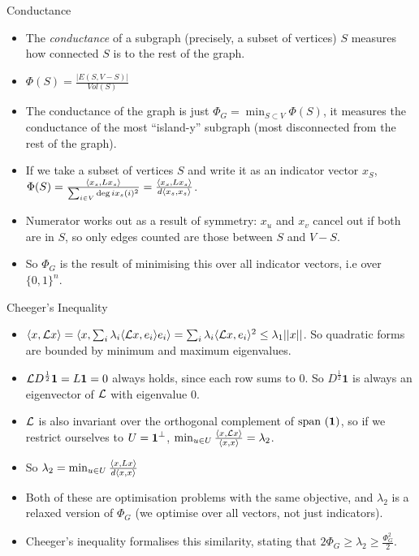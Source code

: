\documentclass[presentation]{beamer}
\begin{document}
\begin{frame}[label={sec:org6593b9e}]{Conductance}
\begin{itemize}
\item The \emph{conductance} of a subgraph (precisely, a subset of vertices) \(S\) measures how connected \(S\) is to the rest of the graph.
\item \(\Phi(S)=\frac{|E(S,V-S)|}{Vol(S)}\)
\item The conductance of the graph  is just \(\Phi_G=\min_{S \subset V} \Phi(S)\), it measures the conductance of the most ``island-y'' subgraph (most disconnected from the rest of the graph).
\item If we take a subset of vertices \(S\) and write it as an indicator vector \(x_S\), \(\Phi(S)=\frac{\langle x_s , Lx_s \rangle}{\sum_{i \in V}\deg i x_s(i)^2}= \frac{\langle x_s , Lx_s \rangle}{d \langle x_s , x_s \rangle}\).
\end{itemize}

\begin{itemize}
\item Numerator works out as a result of symmetry: \(x_u\) and \(x_v\) cancel out if both are in \(S\), so only edges counted are those between \(S\) and \(V-S\).
\item So \(\Phi_G\) is the result of minimising this over all indicator vectors, i.e over \(\{0,1\}^n\).
\end{itemize}
\end{frame}
\begin{frame}[label={sec:orgb01c047}]{Cheeger's Inequality}
\begin{itemize}
\item \(\langle x , \mathcal{L} x \rangle=\langle x , \sum_i \lambda_i\langle \mathcal{L} x , e_i \rangle e_i \rangle=\sum_i \lambda_i\langle \mathcal{L} x , e_i \rangle^2 \le \lambda_1 ||x||\). So quadratic forms are bounded by minimum and maximum eigenvalues.
\item \(\mathcal{L} D^{\frac12}\textbf{1}=L \textbf{1}=0\) always holds, since each row sums to \(0\). So \(D^{\frac12}\textbf{1}\) is always an eigenvector of \(\mathcal{L}\) with eigenvalue \(0\).
\item \(\mathcal{L}\) is also invariant over the orthogonal complement of \(\text{span }(\textbf{1})\), so if we restrict ourselves to \(U=\textbf{1}^{\perp}\), \(\min_{u \in U}\frac{\langle x , \mathcal{L} x \rangle}{\langle x , x \rangle}=\lambda_2\).
\item So \(\lambda_2=\min_{u \in U}\frac{\langle x , Lx \rangle}{d\langle x , x \rangle}\)
\item Both of these are optimisation problems with the same objective, and \(\lambda_2\) is a relaxed version of \(\Phi_G\) (we optimise over all vectors, not just indicators).
\item Cheeger's inequality formalises this similarity, stating that \(2 \Phi_G \ge \lambda_2 \ge \frac{\Phi_{G}^{2}}{2}\).
\end{itemize}
\end{frame}
\end{document}
